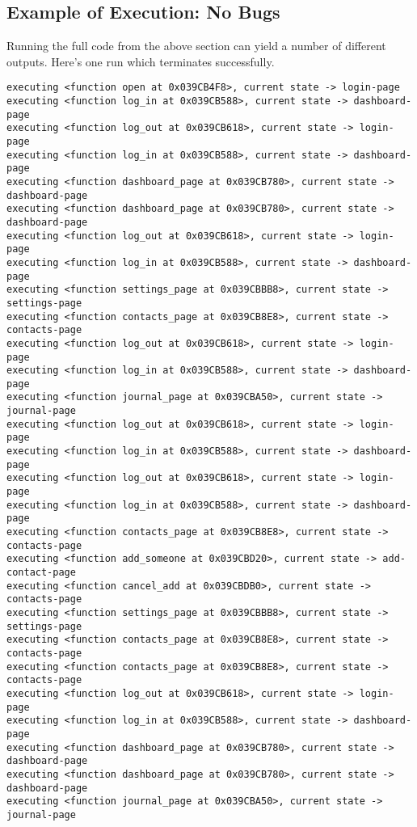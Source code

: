 \subsection{Example of Execution: No Bugs}
Running the full code from the above section can yield a number of different outputs. Here's one run which terminates successfully.

\begin{Verbatim}[fontsize=\small]
executing <function open at 0x039CB4F8>, current state -> login-page
executing <function log_in at 0x039CB588>, current state -> dashboard-page
executing <function log_out at 0x039CB618>, current state -> login-page
executing <function log_in at 0x039CB588>, current state -> dashboard-page
executing <function dashboard_page at 0x039CB780>, current state -> dashboard-page
executing <function dashboard_page at 0x039CB780>, current state -> dashboard-page
executing <function log_out at 0x039CB618>, current state -> login-page
executing <function log_in at 0x039CB588>, current state -> dashboard-page
executing <function settings_page at 0x039CBBB8>, current state -> settings-page
executing <function contacts_page at 0x039CB8E8>, current state -> contacts-page
executing <function log_out at 0x039CB618>, current state -> login-page
executing <function log_in at 0x039CB588>, current state -> dashboard-page
executing <function journal_page at 0x039CBA50>, current state -> journal-page
executing <function log_out at 0x039CB618>, current state -> login-page
executing <function log_in at 0x039CB588>, current state -> dashboard-page
executing <function log_out at 0x039CB618>, current state -> login-page
executing <function log_in at 0x039CB588>, current state -> dashboard-page
executing <function contacts_page at 0x039CB8E8>, current state -> contacts-page
executing <function add_someone at 0x039CBD20>, current state -> add-contact-page
executing <function cancel_add at 0x039CBDB0>, current state -> contacts-page
executing <function settings_page at 0x039CBBB8>, current state -> settings-page
executing <function contacts_page at 0x039CB8E8>, current state -> contacts-page
executing <function contacts_page at 0x039CB8E8>, current state -> contacts-page
executing <function log_out at 0x039CB618>, current state -> login-page
executing <function log_in at 0x039CB588>, current state -> dashboard-page
executing <function dashboard_page at 0x039CB780>, current state -> dashboard-page
executing <function dashboard_page at 0x039CB780>, current state -> dashboard-page
executing <function journal_page at 0x039CBA50>, current state -> journal-page

\end{Verbatim}
